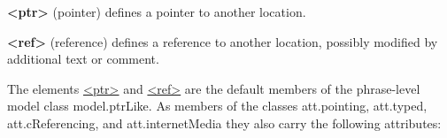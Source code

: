 \begin{sansreflist}
  
\item [\textbf{<ptr>}] (pointer) defines a pointer to another location.
\item [\textbf{<ref>}] (reference) defines a reference to another location, possibly modified by additional text or comment.
\end{sansreflist}
\par
The elements \hyperref[TEI.ptr]{<ptr>} and \hyperref[TEI.ref]{<ref>} are the default members of the phrase-level model class \textsf{model.ptrLike}. As members of the classes \textsf{att.pointing}, \textsf{att.typed}, \textsf{att.cReferencing}, and \textsf{att.internetMedia} they also carry the following attributes: 
\begin{sansreflist}
  

\end{sansreflist}
